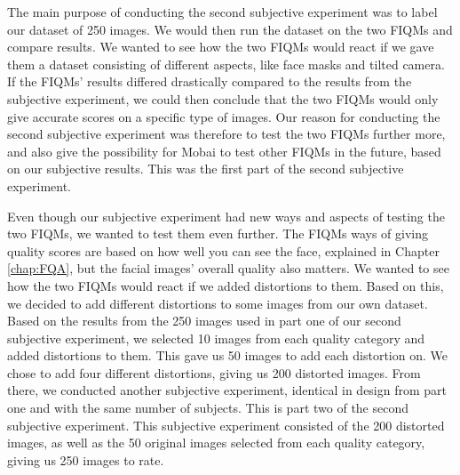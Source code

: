 
The main purpose of conducting the second subjective experiment was to label our dataset of 250 images. We would then run the dataset on the two FIQMs and compare results. We wanted to see how the two FIQMs would react if we gave them a dataset consisting of different aspects, like face masks and tilted camera. If the FIQMs' results differed drastically compared to the results from the subjective experiment, we could then conclude that the two FIQMs would only give accurate scores on a specific type of images. Our reason for conducting the second subjective experiment was therefore to test the two FIQMs further more, and also give the possibility for Mobai to test other FIQMs in the future, based on our subjective results. This was the first part of the second subjective experiment.

Even though our subjective experiment had new ways and aspects of testing the two FIQMs, we wanted to test them even further. The FIQMs ways of giving quality scores are based on how well you can see the face, explained in Chapter \ref{chap:FQA}, but the facial images' overall quality also matters. We wanted to see how the two FIQMs would react if we added distortions to them. Based on this, we decided to add different distortions to some images from our own dataset. Based on the results from the 250 images used in part one of our second subjective experiment, we selected 10 images from each quality category and added distortions to them. This gave us 50 images to add each distortion on. We chose to add four different distortions, giving us 200 distorted images. From there, we conducted another subjective experiment, identical in design from part one and with the same number of subjects. This is part two of the second subjective experiment. This subjective experiment consisted of the 200 distorted images, as well as the 50 original images selected from each quality category, giving us 250 images to rate.       

